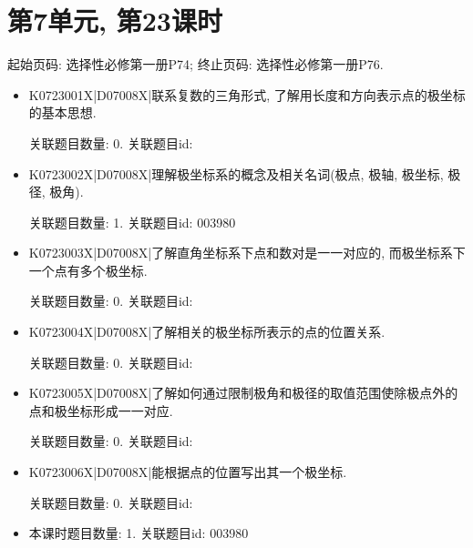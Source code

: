 \section*{第7单元, 第23课时}
起始页码: 选择性必修第一册P74; 终止页码: 选择性必修第一册P76.
\begin{itemize}
\item K0723001X|D07008X|联系复数的三角形式, 了解用长度和方向表示点的极坐标的基本思想.

关联题目数量: 0. 关联题目id: 

\item K0723002X|D07008X|理解极坐标系的概念及相关名词(极点, 极轴, 极坐标, 极径, 极角).

关联题目数量: 1. 关联题目id: 003980

\item K0723003X|D07008X|了解直角坐标系下点和数对是一一对应的, 而极坐标系下一个点有多个极坐标.

关联题目数量: 0. 关联题目id: 

\item K0723004X|D07008X|了解相关的极坐标所表示的点的位置关系.

关联题目数量: 0. 关联题目id: 

\item K0723005X|D07008X|了解如何通过限制极角和极径的取值范围使除极点外的点和极坐标形成一一对应.

关联题目数量: 0. 关联题目id: 

\item K0723006X|D07008X|能根据点的位置写出其一个极坐标.

关联题目数量: 0. 关联题目id: 

\item 本课时题目数量: 1. 关联题目id: 003980

\end{itemize}

